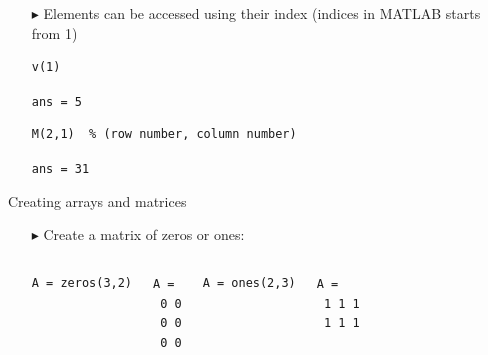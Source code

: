 \documentclass[aspectratio=169]{beamer}
\begin{document}
\begin{frame}[fragile]{}
    \begin{itemize}
        \item[$\blacktriangleright$]
        Elements can be accessed using their index (indices in MATLAB starts from 1)
        \begin{verbatim}
v(1)
        \end{verbatim}
        \vspace{2mm}
        \texttt{ans = 5}

        \begin{verbatim}
M(2,1)  % (row number, column number)
        \end{verbatim}
        \vspace{2mm}
        \texttt{ans = 31}
    \end{itemize}
\end{frame}
 
\begin{frame}[fragile]{Creating arrays and matrices}
    \begin{itemize}
        \item[$\blacktriangleright$]
        Create a matrix of zeros or ones:
        \begin{columns}[T]
            \begin{verbatim}
A = zeros(3,2)
            \end{verbatim}
            \vspace{2mm}
            \texttt{A =} \\
            \texttt{\hspace{3em} 0 \hspace{3em} 0} \\
            \texttt{\hspace{3em} 0 \hspace{3em} 0} \\
            \texttt{\hspace{3em} 0 \hspace{3em} 0}
        
            \begin{verbatim}
A = ones(2,3)
            \end{verbatim}
            \vspace{2mm}
            \texttt{A =} \\
            \texttt{\hspace{3em} 1 \hspace{3em} 1 \hspace{3em} 1} \\
            \texttt{\hspace{3em} 1 \hspace{3em} 1 \hspace{3em} 1}
        \end{columns}
    \end{itemize}
\end{frame}
 
\end{document}
